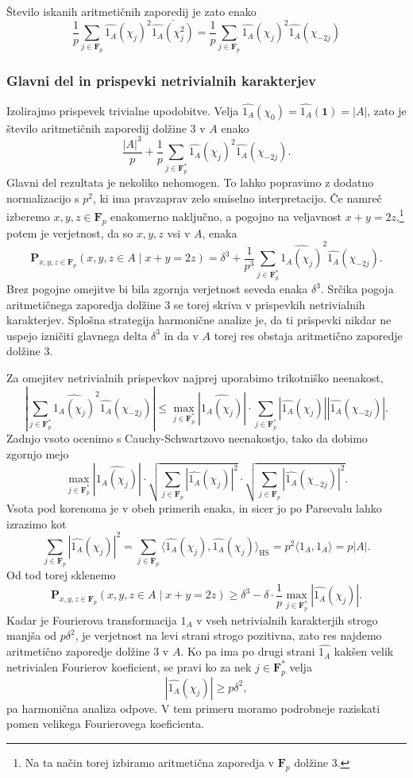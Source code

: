 \documentclass[11pt]{book}
\def\11{\mathbf{1}}
\def\FF{\mathbf{F}}
\def\PP{\mathbf{P}}
\DeclareMathOperator\HS{HS}
\theoremstyle{definition}
\theoremstyle{zgled}
\theoremstyle{odprtproblem}
\theoremstyle{domacanaloga}
\theoremstyle{izrek}
\begin{document}
Število iskanih aritmetičnih zaporedij je zato enako
\[
    \frac{1}{p} \sum_{j \in \FF_p} \widehat{1_A}(\chi_j)^2 \overline{\widehat{1_A}(\chi_j^2)}
    = \frac{1}{p} \sum_{j \in \FF_p} \widehat{1_A}(\chi_j)^2 \widehat{1_A}(\chi_{-2j})
\]

\subsubsection{Glavni del in prispevki netrivialnih karakterjev}

Izolirajmo prispevek trivialne upodobitve. Velja $\widehat{1_A}(\chi_0) = \widehat{1_A}(\11) = |A|$, zato je število aritmetičnih zaporedij dolžine $3$ v $A$ enako
\[
    \frac{|A|^3}{p} +  \frac{1}{p} \sum_{j \in \FF_p^*} \widehat{1_A}(\chi_j)^2 \widehat{1_A}(\chi_{-2j}).
\]
Glavni del rezultata je nekoliko nehomogen. To lahko popravimo z dodatno normalizacijo s $p^2$, ki ima pravzaprav zelo smiselno interpretacijo. Če namreč izberemo $x,y,z \in \FF_p$ enakomerno naključno, a pogojno na veljavnost $x+y=2z$,\footnote{Na ta način torej izbiramo aritmetična zaporedja v $\FF_p$ dolžine $3$.} potem je verjetnost, da so $x,y,z$ vsi v $A$, enaka
\[
    \PP_{x,y,z \in \FF_p}(x,y,z \in A \mid x+y=2z) =
    \delta^3 + \frac{1}{p^3} \sum_{j \in \FF_p^*} \widehat{1_A(\chi_j)}^2 \widehat{1_A}(\chi_{-2j}).
\]
Brez pogojne omejitve bi bila zgornja verjetnost seveda enaka $\delta^3$. Srčika pogoja aritmetičnega zaporedja dolžine $3$ se torej skriva v prispevkih netrivialnih karakterjev. Splošna strategija harmonične analize je, da ti prispevki nikdar ne uspejo izničiti glavnega delta $\delta^3$ in da v $A$ torej res obstaja aritmetično zaporedje dolžine $3$. 

Za omejitev netrivialnih prispevkov najprej uporabimo trikotniško neenakost,
\[
    \left| \sum_{j \in \FF_p^*} \widehat{1_A(\chi_j)}^2 \widehat{1_A}(\chi_{-2j}) \right|
    \leq \max_{j \in \FF_p^*} |\widehat{1_A(\chi_j)}| \cdot 
    \sum_{j \in \FF_p^*} 
    |\widehat{1_A}(\chi_j)|
    |\widehat{1_A}(\chi_{-2j})|.
\]
Zadnjo vsoto ocenimo s Cauchy-Schwartzovo neenakostjo, tako da dobimo zgornjo mejo
\[
    \max_{j \in \FF_p^*} |\widehat{1_A(\chi_j)}| \cdot 
    \sqrt{\sum_{j \in \FF_p} |\widehat{1_A}(\chi_j)|^2} \cdot \sqrt{\sum_{j \in \FF_p} |\widehat{1_A}(\chi_{-2j})|^2}.
\]
Vsota pod korenoma je v obeh primerih enaka, in sicer jo po Parsevalu lahko izrazimo kot
\[
    \sum_{j \in \FF_p} |\widehat{1_A}(\chi_j)|^2
    = \sum_{j \in \FF_p} \langle \widehat{1_A}(\chi_j), \widehat{1_A}(\chi_j) \rangle_{\HS}
    = p^2 \langle 1_A, 1_A \rangle = p |A|.
\]
Od tod torej sklenemo
\[
    \PP_{x,y,z \in \FF_p}(x,y,z \in A \mid x+y=2z)
    \geq \delta^3 - \delta \cdot \frac{1}{p} \max_{j \in \FF_p^*} |\widehat{1_A}(\chi_j)|.
\] 
Kadar je Fourierova transformacija $1_A$ v vseh netrivialnih karakterjih strogo manjša od $p \delta^2$, je verjetnost na levi strani strogo pozitivna, zato res najdemo aritmetično zaporedje dolžine $3$ v $A$. Ko pa ima po drugi strani $\widehat{1_A}$ kakšen velik netrivialen Fourierov koeficient, se pravi ko za nek $j \in \FF_p^*$ velja
\[
    |\widehat{1_A}(\chi_j)| \geq p \delta^2,
\]
pa harmonična analiza odpove. V tem primeru moramo podrobneje raziskati pomen velikega Fourierovega koeficienta.
\end{document}
